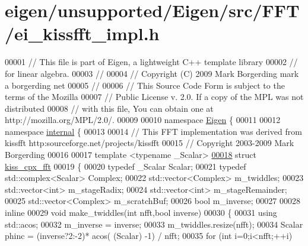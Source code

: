 \hypertarget{eigen_2unsupported_2_eigen_2src_2_f_f_t_2ei__kissfft__impl_8h_source}{}\section{eigen/unsupported/\+Eigen/src/\+F\+F\+T/ei\+\_\+kissfft\+\_\+impl.h}
\label{eigen_2unsupported_2_eigen_2src_2_f_f_t_2ei__kissfft__impl_8h_source}

\begin{DoxyCode}
00001 \textcolor{comment}{// This file is part of Eigen, a lightweight C++ template library}
00002 \textcolor{comment}{// for linear algebra.}
00003 \textcolor{comment}{//}
00004 \textcolor{comment}{// Copyright (C) 2009 Mark Borgerding mark a borgerding net}
00005 \textcolor{comment}{//}
00006 \textcolor{comment}{// This Source Code Form is subject to the terms of the Mozilla}
00007 \textcolor{comment}{// Public License v. 2.0. If a copy of the MPL was not distributed}
00008 \textcolor{comment}{// with this file, You can obtain one at http://mozilla.org/MPL/2.0/.}
00009 
00010 \textcolor{keyword}{namespace }\hyperlink{namespace_eigen}{Eigen} \{ 
00011 
00012 \textcolor{keyword}{namespace }\hyperlink{namespaceinternal}{internal} \{
00013 
00014   \textcolor{comment}{// This FFT implementation was derived from kissfft http:sourceforge.net/projects/kissfft}
00015   \textcolor{comment}{// Copyright 2003-2009 Mark Borgerding}
00016 
00017 \textcolor{keyword}{template} <\textcolor{keyword}{typename} \_Scalar>
\hyperlink{struct_eigen_1_1internal_1_1kiss__cpx__fft}{00018} \textcolor{keyword}{struct }\hyperlink{struct_eigen_1_1internal_1_1kiss__cpx__fft}{kiss\_cpx\_fft}
00019 \{
00020   \textcolor{keyword}{typedef} \_Scalar Scalar;
00021   \textcolor{keyword}{typedef} std::complex<Scalar> Complex;
00022   std::vector<Complex> m\_twiddles;
00023   std::vector<int> m\_stageRadix;
00024   std::vector<int> m\_stageRemainder;
00025   std::vector<Complex> m\_scratchBuf;
00026   \textcolor{keywordtype}{bool} m\_inverse;
00027 
00028   \textcolor{keyword}{inline}
00029     \textcolor{keywordtype}{void} make\_twiddles(\textcolor{keywordtype}{int} nfft,\textcolor{keywordtype}{bool} inverse)
00030     \{
00031       \textcolor{keyword}{using} std::acos;
00032       m\_inverse = inverse;
00033       m\_twiddles.resize(nfft);
00034       Scalar phinc =  (inverse?2:-2)* acos( (Scalar) -1)  / nfft;
00035       \textcolor{keywordflow}{for} (\textcolor{keywordtype}{int} i=0;i<nfft;++i)

\end{DoxyCode}
